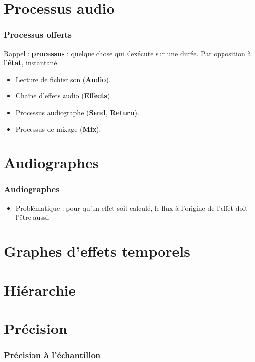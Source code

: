 \documentclass{beamer}
\begin{document}
\section{Processus audio}
\begin{frame}	
	\frametitle{Processus offerts}    
	\Large
	Rappel : \textbf{processus} : quelque chose qui s'exécute sur une durée. Par opposition à l'\textbf{état}, instantané.
	\begin{itemize}
		\item Lecture de fichier son (\textbf{Audio}).
		\item Chaîne d'effets audio (\textbf{Effects}).
		\item Processus audiographe (\textbf{Send}, \textbf{Return}).
		\item Processus de mixage (\textbf{Mix}).
	\end{itemize}    
\end{frame}

\section{Audiographes}
\begin{frame}
	\frametitle{Audiographes}    
	\Large
	\begin{itemize}
		\item Problématique : pour qu'un effet soit calculé, le flux à l'origine de l'effet doit l'être aussi. 
	\end{itemize}    
\end{frame}


\section{Graphes d'effets temporels}

\section{Hiérarchie}

\section{Précision}

\begin{frame}
	\frametitle{Précision à l'échantillon}
\end{frame}  

%
%
\end{document}
